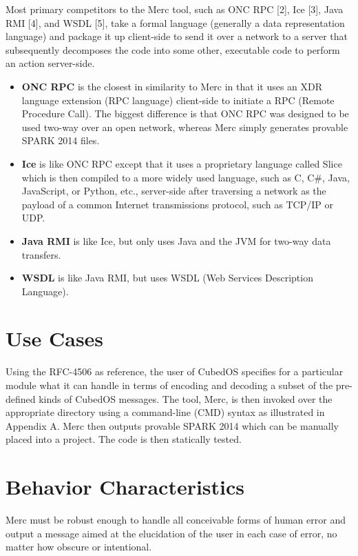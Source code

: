 Most primary competitors to the Merc tool, such as ONC RPC [2], Ice [3], Java RMI [4], and
WSDL [5], take a formal language (generally a data representation language) and package it up
client-side to send it over a network to a server that subsequently decomposes the code into
some other, executable code to perform an action server-side.

\begin{itemize}
\item \textbf{ONC RPC} is the closest in similarity to Merc in that it uses an XDR language
  extension (RPC language) client-side to initiate a RPC (Remote Procedure Call). The biggest
  difference is that ONC RPC was designed to be used two-way over an open network, whereas
  Merc simply generates provable SPARK 2014 files.

\item \textbf{Ice} is like ONC RPC except that it uses a proprietary language called Slice which
  is then compiled to a more widely used language, such as C, C\#, Java, JavaScript, or Python,
  etc., server-side after traversing a network as the payload of a common Internet transmissions
  protocol, such as TCP/IP or UDP.

\item \textbf{Java RMI} is like Ice, but only uses Java and the JVM for two-way data transfers.

\item \textbf{WSDL} is like Java RMI, but uses WSDL (Web Services Description Language).
\end{itemize}

\section{Use Cases}

Using the RFC-4506 as reference, the user of CubedOS specifies for a particular module what it
can handle in terms of encoding and decoding a subset of the pre-defined kinds of CubedOS
messages. The tool, Merc, is then invoked over the appropriate directory using a command-line
(CMD) syntax as illustrated in Appendix A. Merc then outputs provable SPARK 2014 which can be
manually placed into a project. The code is then statically tested.

\section{Behavior Characteristics}

Merc must be robust enough to handle all conceivable forms of human error and output a
message aimed at the elucidation of the user in each case of error, no matter how obscure or
intentional.

